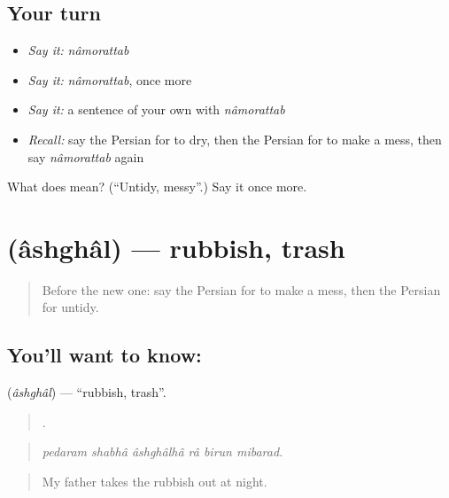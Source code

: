 \subsection*{Your turn}
\begin{itemize}
\raggedright
  \item \emph{Say it:} \emph{nâmorattab}
  \item \emph{Say it:} \emph{nâmorattab}, once more
  \item \emph{Say it:} a sentence of your own with \emph{nâmorattab}
  \item \emph{Recall:} say the Persian for to dry, then the Persian for to make a mess, then say \emph{nâmorattab} again
\end{itemize}

\begin{tcolorbox}[breakable,colback=teal!4,colframe=teal!35!black,title={Before you move on}]
What does  mean? (\textquotedblleft{}Untidy, messy\textquotedblright{}.) Say it once more.
\end{tcolorbox}
\section[\texorpdfstring{\fa{آشغال} (âshghâl)}{آشغال (âshghâl)}]{ (âshghâl) — rubbish, trash}

\label{lesson:FA-C536-ashghal}



\begin{quote}
Before the new one: say the Persian for to make a mess, then the Persian for untidy.
\end{quote}

\subsection*{You'll want to know: }
\textbf{} (\emph{âshghâl}) — \textquotedblleft{}rubbish, trash\textquotedblright{}.

\begin{quote}
     .
\end{quote}

\begin{quote}
\emph{pedaram shabhâ âshghâlhâ râ birun mibarad.}
\end{quote}

\begin{quote}
My father takes the rubbish out at night.
\end{quote}

